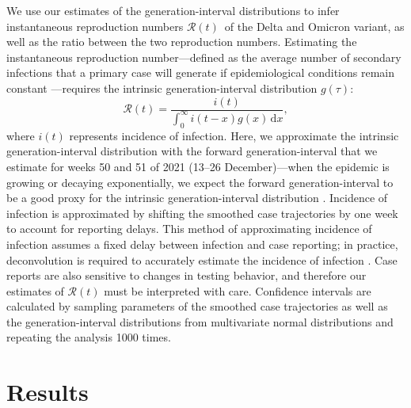 \documentclass[12pt]{article}
\newcommand{\Rt}{\ensuremath{{\mathcal R}(t)}\xspace}
\newcommand{\dd}[1]{\ensuremath{\, \mathrm{d}#1}}
\newcommand{\dx}{\dd{x}}
\begin{document}
We use our estimates of the generation-interval distributions to infer instantaneous reproduction numbers \Rt\ of the Delta and Omicron variant, as well as the ratio between the two reproduction numbers.
Estimating the instantaneous reproduction number---defined as the average number of secondary infections that a primary case will generate if epidemiological conditions remain constant \citep{fraser2007estimating}---requires the intrinsic generation-interval distribution $g(\tau)$:
\begin{equation}
\Rt = \frac{i(t)}{\int_0^\infty i(t-x) g(x) \dx},
\end{equation}
where $i(t)$ represents incidence of infection.
Here, we approximate the intrinsic generation-interval distribution with the forward generation-interval that we estimate for weeks 50 and 51 of 2021 (13--26 December)---when the epidemic is growing or decaying exponentially, we expect the forward generation-interval to be a good proxy for the intrinsic generation-interval distribution \citep{champredon2015intrinsic, park2020inferring}.
Incidence of infection is approximated by shifting the smoothed case trajectories by one week to account for reporting delays.
This method of approximating incidence of infection assumes a fixed delay between infection and case reporting;
in practice, deconvolution is required to accurately estimate the incidence of infection \citep{goldstein2009reconstructing}.
Case reports are also sensitive to changes in testing behavior, and therefore our estimates of $\Rt$ must be interpreted with care.
Confidence intervals are calculated by sampling parameters of the smoothed case trajectories as well as the generation-interval distributions from multivariate normal distributions and repeating the analysis 1000 times.

\section{Results}
\end{document}
